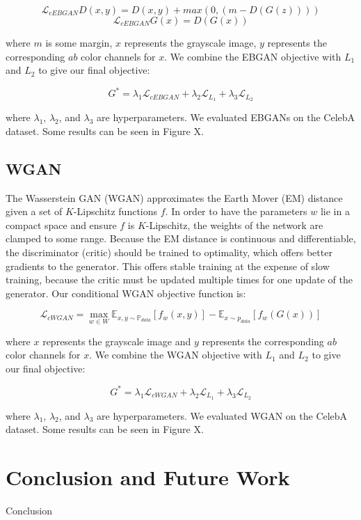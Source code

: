 \documentclass{article} %
\begin{document}
\[\mathcal{L}_{cEBGAN} D(x,y) = D(x,y) + max(0, (m-D(G(z)))) \]
\[\mathcal{L}_{cEBGAN} G(x) = D(G(x)) \]


\noindent where $m$ is some margin, $x$ represents the grayscale image, $y$ represents the corresponding
$ab$ color channels for $x$. We combine the EBGAN objective with $L_1$ and $L_2$ to give our final objective:

\[ G^* = \lambda_1 \mathcal{L}_{cEBGAN} + \lambda_2 \mathcal{L}_{L_1} + \lambda_3 \mathcal{L}_{L_2} \]

\noindent where $\lambda_1$, $\lambda_2$, and $\lambda_3$ are hyperparameters. We evaluated EBGANs on
the CelebA dataset. Some results can be seen in Figure X. 

\subsection{WGAN}
The Wasserstein GAN (WGAN) approximates the Earth Mover (EM) distance given a set of $K$-Lipschitz functions 
$f$. In order to have the parameters $w$ lie in a compact space and ensure $f$ is $K$-Lipschitz, the weights
of the network are clamped to some range. Because the EM distance is continuous and differentiable, the
discriminator (critic) should be trained to optimality, which offers better gradients to the generator. This 
offers stable training at the expense of slow training, because the critic must be updated multiple times
for one update of the generator. Our conditional WGAN objective function is:

\[\mathcal{L}_{cWGAN} = \max\limits_{w \in W} \mathbb{E}_{x,y \sim \mathbb{P}_{data}}[f_w(x,y)] -
\mathbb{E}_{x \sim p_{data}}[f_w(G(x))]\]

\noindent where $x$ represents the grayscale image and $y$ represents the corresponding
$ab$ color channels for $x$. We combine the WGAN objective with $L_1$ and $L_2$ to give our final objective:


\[ G^* = \lambda_1 \mathcal{L}_{cWGAN} + \lambda_2 \mathcal{L}_{L_1} + \lambda_3 \mathcal{L}_{L_2} \]

\noindent where $\lambda_1$, $\lambda_2$, and $\lambda_3$ are hyperparameters. We evaluated WGAN on
the CelebA dataset. Some results can be seen in Figure X. 



\section{Conclusion and Future Work}
Conclusion

\vspace{1mm}
%

\footnotesize

\end{document}
